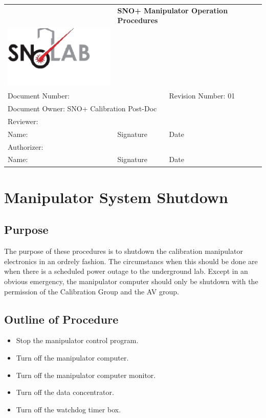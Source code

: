 \documentclass[11pt]{article}
\begin{document}
\begin{tabular}{||l|l|l||}
\hline\hline
& \multicolumn{2}{p{8cm}||}{\bf SNO+ Manipulator Operation Procedures} \\
\includegraphics[width=6cm]{../snolablogo.pdf} & \multicolumn{2}{p{8cm}||}{} \\
\hline
\multicolumn{2}{||p{8.5cm}|}{Document Number:} & Revision Number: 01\\
\hline
\multicolumn{3}{||l||}{Document Owner: SNO+ Calibration Post-Doc} \\
\hline
\multicolumn{3}{||l||}{Reviewer:}\\
\hline
Name: & Signature & Date \\
\hline
\multicolumn{3}{||l||}{Authorizer:}\\
\hline
Name: & Signature & Date \\
\hline\hline
\end{tabular}
\thispagestyle{empty}

\section{Manipulator System Shutdown}

\subsection{Purpose}
The purpose of these procedures is to shutdown the calibration manipulator electronics in an ordrely fashion. The circumstancs when this should be done are when there is a scheduled power outage to the underground lab. Except in an obvious emergency, the manipulator computer should only be shutdown with the permission of the Calibration Group and the AV group.

\subsection{Outline of Procedure}
\begin{itemize}
\item Stop the manipulator control program.
\item Turn off the manipulator computer.
\item Turn off the manipulator computer monitor.
\item Turn off the data concentrator.
\item Turn off the watchdog timer box.
\end{itemize}
\end{document}
